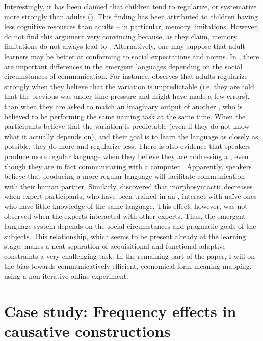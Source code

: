 \documentclass[output=paper]{langsci/langscibook}
\begin{document}
Interestingly, it has been claimed that children tend to regularize, or systematize more strongly than adults (\citealt{HudsonKamNewport2009}). This finding has been attributed to children having less cognitive resources than adults – in particular, memory limitations. However, \citet{SmithEtAl2017} do not find this argument very convincing because, as they claim, memory limitations do not always lead to . Alternatively, one may suppose that adult learners may be better at conforming to social expectations and norms. In , there are important differences in the emergent languages depending on the social circumstances of communication. For instance, \citet{Perfors2016} observes that adults regularize strongly when they believe that the variation is unpredictable (i.e. they are told that the previous  was under time pressure and might have made a few errors), than when they are asked to match an imaginary output of another , who is believed to be performing the same naming task at the same time. When the participants believe that the variation is predictable (even if they do not know what it actually depends on), and their goal is to learn the language as closely as possible, they do  more and regularize less. There is also evidence that speakers produce more regular language when they believe they are addressing a , even though they are in fact communicating with a computer \citep{FehérEtAl2016}. Apparently, speakers believe that producing a more regular language will facilitate communication with their human partner. Similarly, \citet{Little2011} discovered that morphosyntactic  decreases when expert participants, who have been trained in an , interact with naïve ones who have little knowledge of the same language. This effect, however, was not observed when the experts interacted with other experts. Thus, the emergent language system depends on the social circumstances and pragmatic goals of the subjects. This relationship, which seems to be present already at the learning stage, makes a neat separation of acquisitional and functional-adaptive constraints a very challenging task.  
\newpage
In the remaining part of the paper, I will  on the bias towards communicatively efficient, economical form-meaning mapping, using a non-iterative online experiment.

\section{Case study: Frequency effects in causative constructions}\label{sec:levshina:3}
\end{document}
